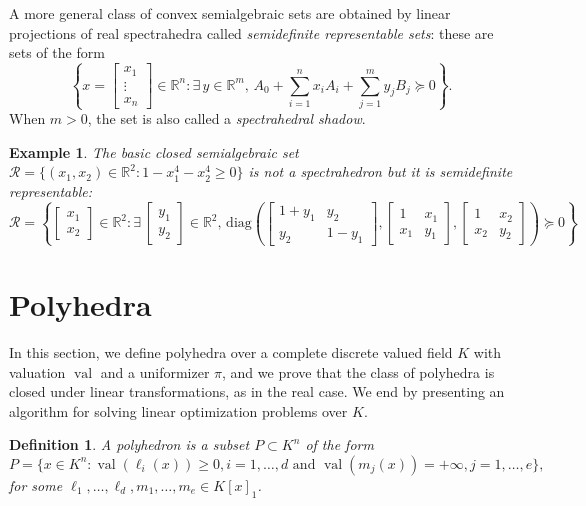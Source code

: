 \documentclass[a4paper,oneside,10pt]{article}
\newtheorem{definition}[theorem]{Definition}
\newtheorem{example}[theorem]{Example}
\newcommand{\R}{\mathbb{R}} %
\DeclareMathOperator{\val}{val}
\def\diag{\mathrm{diag}}
\begin{document}
A more general class of convex semialgebraic sets are obtained by linear projections of real spectrahedra
called \emph{semidefinite representable sets}: these are sets of the form
$$
\left\{x = \left[\begin{smallmatrix} x_1 \\ \vdots \\ x_n \end{smallmatrix}\right] \in \R^n : \exists\,y\in\R^m, \, A_0 + \sum_{i=1}^n x_i A_i + \sum_{j=1}^m y_j B_j \succeq 0\right\}.
$$
When $m>0$, the set is also called a \emph{spectrahedral shadow}.

\begin{example}
\label{fermat_quartic}
The basic closed semialgebraic set $\mathcal{R} = \{(x_1,x_2) \in \R^2 : 1-x_1^4-x_2^4 \geq 0\}$ is not a spectrahedron
but it is semidefinite representable:
$$
\mathcal{R} = \left\{\begin{bmatrix} x_1 \\ x_2 \end{bmatrix} \in \R^2 :
\exists\,
\begin{bmatrix} y_1 \\ y_2 \end{bmatrix} \in \R^2, \,
\diag\left(
\begin{bmatrix}
  1+y_1 & y_2 \\
  y_2 & 1-y_1
\end{bmatrix},
\begin{bmatrix}
  1 & x_1 \\
  x_1 & y_1
\end{bmatrix},
\begin{bmatrix}
  1 & x_2 \\
  x_2 & y_2
\end{bmatrix}
\right)
\succeq 0
\right\}
$$
\end{example}


\section{Polyhedra}

In this section, we define polyhedra over a complete discrete valued field $K$ with valuation $\val$ and a uniformizer $\pi$, and we prove that the class of polyhedra is closed under linear transformations, as in the real case. We end by presenting an algorithm for solving linear optimization problems over $K$.

\begin{definition}
  \label{def_polyhedra}
  A \emph{polyhedron} is a subset $P \subset K^n$ of the form
  $$
  P = \{x \in K^n : \val(\ell_i(x)) \geq 0, i=1,\ldots,d \text{ and }
  \val(m_j(x)) = +\infty, j=1,\ldots,e\},
  $$
  for some $\ell_1,\ldots,\ell_d,m_1,\ldots,m_e \in K[x]_1$.
\end{definition}
\end{document}
